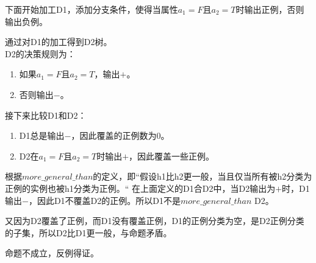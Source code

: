 \documentclass{article}
\begin{document}
    下面开始加工D1，添加分支条件，使得当属性\(a_1 = F\)且\(a_2 = T\)时输出正例，否则输出负例。
    
    通过对D1的加工得到D2树。\\
    
    D2的决策规则为：

    \begin{enumerate}
        \item 如果\(a_1 = F\)且\(a_2 = T\)，输出$+$。
        \item 否则输出$-$。
    \end{enumerate}

    接下来比较D1和D2：

    \begin{enumerate}
        \item D1总是输出$-$，因此覆盖的正例数为0。
        \item D2在\(a_1 = F\)且\(a_2 = T\)时输出$+$，因此覆盖一些正例。
    \end{enumerate}

    根据$more\_general\_than$的定义，即“假设h1比h2更一般，当且仅当所有被h2分类为正例的实例也被h1分类为正例。“ 在上面定义的D1合D2中，当D2输出为$+$时，D1输出$-$，因此D1不覆盖D2的正例。所以D1不是$more\_general\_than$ D2。  

    又因为D2覆盖了正例，而D1没有覆盖正例，D1的正例分类为空，是D2正例分类的子集，所以D2比D1更一般，与命题矛盾。

    命题不成立，反例得证。    
\end{document}
